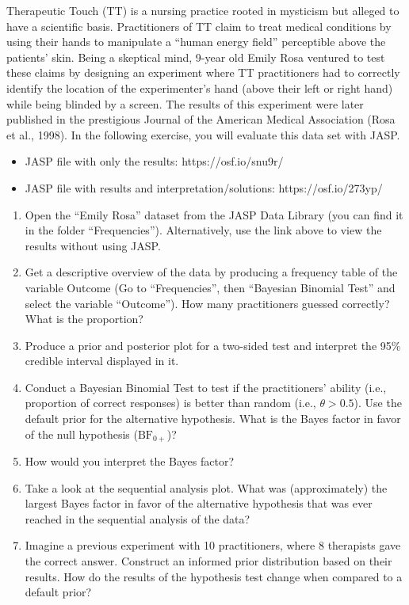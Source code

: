 \documentclass[
  letterpaper,
  DIV=11,
  numbers=noendperiod]{scrreprt}
\providecommand{\tightlist}{%
  \setlength{\itemsep}{0pt}\setlength{\parskip}{0pt}}\usepackage{longtable,booktabs,array}
\begin{document}
Therapeutic Touch (TT) is a nursing practice rooted in mysticism but
alleged to have a scientific basis. Practitioners of TT claim to treat
medical conditions by using their hands to manipulate a ``human energy
field'' perceptible above the patients' skin. Being a skeptical mind,
9-year old Emily Rosa ventured to test these claims by designing an
experiment where TT practitioners had to correctly identify the location
of the experimenter's hand (above their left or right hand) while being
blinded by a screen. The results of this experiment were later published
in the prestigious Journal of the American Medical Association (Rosa et
al., 1998). In the following exercise, you will evaluate this data set
with JASP.

\begin{itemize}
\tightlist
\item
  JASP file with only the results: https://osf.io/snu9r/
\item
  JASP file with results and interpretation/solutions:
  https://osf.io/273yp/
\end{itemize}

\begin{enumerate}
\def\labelenumi{\arabic{enumi}.}
\tightlist
\item
  Open the ``Emily Rosa'' dataset from the JASP Data Library (you can
  find it in the folder ``Frequencies''). Alternatively, use the link
  above to view the results without using JASP.
\item
  Get a descriptive overview of the data by producing a frequency table
  of the variable Outcome (Go to ``Frequencies'', then ``Bayesian
  Binomial Test'' and select the variable ``Outcome''). How many
  practitioners guessed correctly? What is the proportion?
\item
  Produce a prior and posterior plot for a two-sided test and interpret
  the 95\% credible interval displayed in it.
\item
  Conduct a Bayesian Binomial Test to test if the practitioners' ability
  (i.e., proportion of correct responses) is better than random (i.e.,
  \(\theta > 0.5\)). Use the default prior for the alternative
  hypothesis. What is the Bayes factor in favor of the null hypothesis
  (\(\text{BF}_{0+}\))?
\item
  How would you interpret the Bayes factor?
\item
  Take a look at the sequential analysis plot. What was (approximately)
  the largest Bayes factor in favor of the alternative hypothesis that
  was ever reached in the sequential analysis of the data?
\item
  Imagine a previous experiment with 10 practitioners, where 8
  therapists gave the correct answer. Construct an informed prior
  distribution based on their results. How do the results of the
  hypothesis test change when compared to a default prior?
\end{enumerate}
\end{document}
